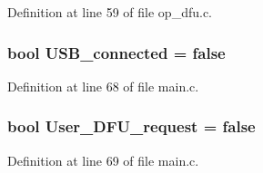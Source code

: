 \-Definition at line 59 of file op\-\_\-dfu.\-c.

\hypertarget{group___flying_f4_b_l_ga4e4577933ec2d1b36fd2a19510090d43}{
\subsubsection[{\-U\-S\-B\-\_\-connected}]{\setlength{\rightskip}{0pt plus 5cm}bool {\bf \-U\-S\-B\-\_\-connected} = false}}\label{group___flying_f4_b_l_ga4e4577933ec2d1b36fd2a19510090d43}


\-Definition at line 68 of file main.\-c.

\hypertarget{group___flying_f4_b_l_ga4df4c80fe3df830049b9543a72b125a5}{
\subsubsection[{\-User\-\_\-\-D\-F\-U\-\_\-request}]{\setlength{\rightskip}{0pt plus 5cm}bool {\bf \-User\-\_\-\-D\-F\-U\-\_\-request} = false}}\label{group___flying_f4_b_l_ga4df4c80fe3df830049b9543a72b125a5}


\-Definition at line 69 of file main.\-c.

